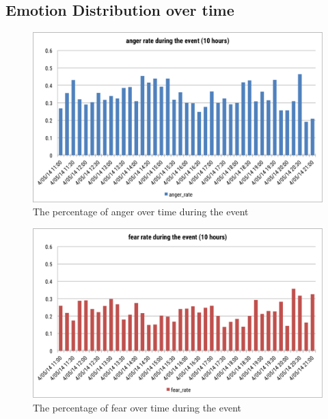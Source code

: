 \subsection{Emotion Distribution over time}
\clearpage
\begin{figure}[htb!] 
\centering    
\includegraphics[width=1.0\textwidth]{AngerRateEvent}
\caption{The percentage of anger over time during the event}
\label{fig:angerRateEvent}
\end{figure}

\begin{figure}[htb!] 
\centering    
\includegraphics[width=1.0\textwidth]{FearRateEvent}
\caption{The percentage of fear over time during the event}
\label{fig:fearRateEvent}
\end{figure}

